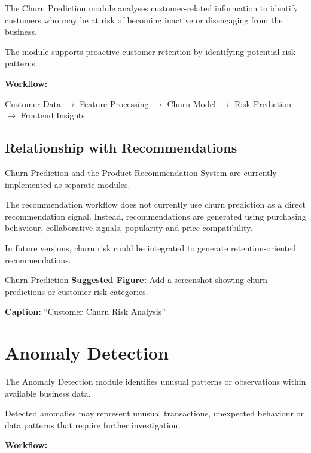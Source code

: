 \documentclass[12pt,a4paper]{report}
\begin{document}
The Churn Prediction module analyses customer-related information to
identify customers who may be at risk of becoming inactive or
disengaging from the business.

The module supports proactive customer retention by identifying
potential risk patterns.

\textbf{Workflow:}

\begin{center}
Customer Data
$\rightarrow$
Feature Processing
$\rightarrow$
Churn Model
$\rightarrow$
Risk Prediction
$\rightarrow$
Frontend Insights
\end{center}

\subsection{Relationship with Recommendations}

Churn Prediction and the Product Recommendation System are currently
implemented as separate modules.

The recommendation workflow does not currently use churn prediction as
a direct recommendation signal. Instead, recommendations are generated
using purchasing behaviour, collaborative signals, popularity and price
compatibility.

In future versions, churn risk could be integrated to generate
retention-oriented recommendations.

\begin{screenshotplaceholder}{Churn Prediction}
\textbf{Suggested Figure:} Add a screenshot showing churn predictions
or customer risk categories.

\textbf{Caption:} ``Customer Churn Risk Analysis''
\end{screenshotplaceholder}



\section{Anomaly Detection}

The Anomaly Detection module identifies unusual patterns or observations
within available business data.

Detected anomalies may represent unusual transactions, unexpected
behaviour or data patterns that require further investigation.

\textbf{Workflow:}
\end{document}
